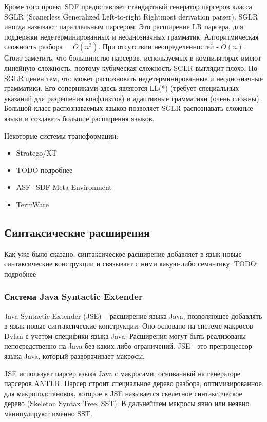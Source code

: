 \documentclass[a4paper,12pt]{article}
\begin{document}
Кроме того проект SDF предоставляет стандартный генератор парсеров класса SGLR
(Scanerless Generalized Left-to-right Rightmost derivation parser). SGLR иногда
называют параллельным парсером. Это расширение LR парсера, для поддержки
недетерминированных и неоднозначных грамматик. Алгоритмическая сложность разбора
= $O(n^3)$. При отсутствии неопределенностей - $O(n)$. Стоит заметить, что
большинство парсеров, используемых в компиляторах имеют линейную сложность,
поэтому кубическая сложность SGLR выглядит плохо. Но SGLR ценен тем, что может
распозновать недетерминированные и неоднозначные грамматики. Его соперниками
здесь являются LL(*) (требует специальных указаний для разрешения конфликтов) и
адаптивные грамматики (очень сложны). Большой класс распознаваемых языков
позволяет SGLR распознавать сложные языки и создавать большие расширения языков.

Некоторые системы трансформации:
\begin{itemize}
  \item Stratego/XT
  \item TODO подробнее
  \item ASF+SDF Meta Environment
  \item TermWare
\end{itemize}

\subsection{Синтаксические расширения}
Как уже было сказано, синтаксическое расширение добавляет в язык новые
синтаксические конструкции и связывает с ними какую-либо семантику.
TODO: подробнее

\subsubsection{Система Java Syntactic Extender}
\label{jse}
Java Syntactic Extender (JSE) -- расширение языка Java, позволяющее добавлять в
язык новые синтаксические конструкции. Оно основано на системе макросов Dylan с
учетом специфики языка Java. Расширения могут быть реализованы
непосредственно на Java без каких-либо ограничений. JSE - это
препроцессор языка Java, который разворачивает макросы.

JSE использует парсер языка Java с макросами, основанный на генераторе парсеров
ANTLR. Парсер строит специальное дерево разбора, оптимизированное для
макроподстановок, которое в JSE называется скелетное синтаксическое дерево
(Skeleton Syntax Tree, SST). В дальнейшем макросы явно или неявно манипулируют
именно SST.
\end{document}
